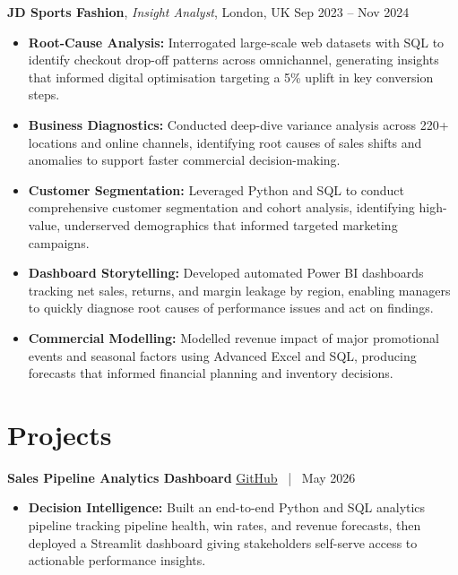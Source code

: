 \documentclass[10pt, a4paper]{article}
\begin{document}
\vspace{4pt}

\textbf{JD Sports Fashion}, \textit{Insight Analyst}, London, UK \hfill Sep 2023 -- Nov 2024
\begin{itemize}
    \item \textbf{Root-Cause Analysis:} Interrogated large-scale web datasets with SQL to identify checkout drop-off patterns across omnichannel, generating insights that informed digital optimisation targeting a 5\% uplift in key conversion steps.
    \item \textbf{Business Diagnostics:} Conducted deep-dive variance analysis across 220+ locations and online channels, identifying root causes of sales shifts and anomalies to support faster commercial decision-making.
    \item \textbf{Customer Segmentation:} Leveraged Python and SQL to conduct comprehensive customer segmentation and cohort analysis, identifying high-value, underserved demographics that informed targeted marketing campaigns.
    \item \textbf{Dashboard Storytelling:} Developed automated Power BI dashboards tracking net sales, returns, and margin leakage by region, enabling managers to quickly diagnose root causes of performance issues and act on findings.
    \item \textbf{Commercial Modelling:} Modelled revenue impact of major promotional events and seasonal factors using Advanced Excel and SQL, producing forecasts that informed financial planning and inventory decisions.
\end{itemize}

\section*{Projects}

\textbf{Sales Pipeline Analytics Dashboard} \hfill \href{https://github.com/VishalP44/sales-pipeline-analytics}{GitHub} \, | \, May 2026
\begin{itemize}
    \item \textbf{Decision Intelligence:} Built an end-to-end Python and SQL analytics pipeline tracking pipeline health, win rates, and revenue forecasts, then deployed a Streamlit dashboard giving stakeholders self-serve access to actionable performance insights.
\end{itemize}

\vspace{4pt}
\end{document}
